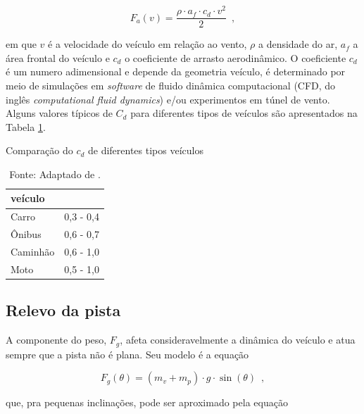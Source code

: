 \begin{equation}
	\label{eq:Fa}
	F_a(v) = \frac{\rho \cdot a_f \cdot c_d \cdot v^2}{2}
	\enspace,
\end{equation}

em que $v$ é a velocidade do veículo em relação ao vento, $\rho$ a densidade do ar, $a_{f}$ a área frontal do
veículo e $c_{d}$ o coeficiente de arrasto aerodinâmico.
O coeficiente $c_{d}$ é um numero adimensional e depende da geometria veículo, é determinado por meio de simulações em \textit{software} de fluido
dinâmica
computacional (CFD, do inglês \textit{computational fluid dynamics}) e/ou experimentos em túnel de vento. \cite[Seç.~2.1.1]{book:guzzella2012vehicle} Alguns
valores típicos de $C_{d}$ para diferentes tipos de
veículos são apresentados na Tabela \ref{tab:ComparacaoCD}.

\begin{table}[h]
	\centering
	\caption{Comparação do $c_{d}$ de diferentes tipos veículos}
	\begin{tabular}{ll}
		\toprule
		\textbf{veículo} & \boldsymbol{$c_{d}$} \\
		\hline
		Carro            & 0,3 - 0,4            \\
		Ônibus           & 0,6 - 0,7            \\
		Caminhão         & 0,6 - 1,0            \\
		Moto             & 0,5 - 1,0            \\
		\bottomrule
	\end{tabular}
	\caption*{\footnotesize Fonte: Adaptado de . \cite[Seç.~8.3]{book:GroundVehicleDynamics}}
	\label{tab:ComparacaoCD}
\end{table}

\subsection{Relevo da pista}

A componente do peso, $F_{g}$, afeta consideravelmente a dinâmica do veículo e atua sempre que a pista não é plana. Seu modelo é a equação

\begin{equation}
	\label{eq:Fg}
	F_{g}(\theta) = (m_v + m_p) \cdot g \cdot \sin(\theta)
	\enspace,
\end{equation}

que, pra pequenas inclinações, pode ser aproximado pela equação

